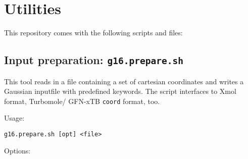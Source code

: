 \documentclass[   %
  final,          %
  a4paper         %
]{article}
\begin{document}
\section{Utilities}

This repository comes with the following scripts and files:

\subsection{Input preparation: \texorpdfstring{{\lstinline`g16.prepare.sh`}}{g16.prepare.sh}}

This tool reads in a file containing a set of cartesian coordinates and
writes a Gaussian inputfile with predefined keywords. 
The script interfaces to Xmol format, 
Turbomole/ GFN-xTB \texttt{coord} format, too.

Usage: 

\lstinline`g16.prepare.sh [opt] <file>`

Options:
\end{document}
